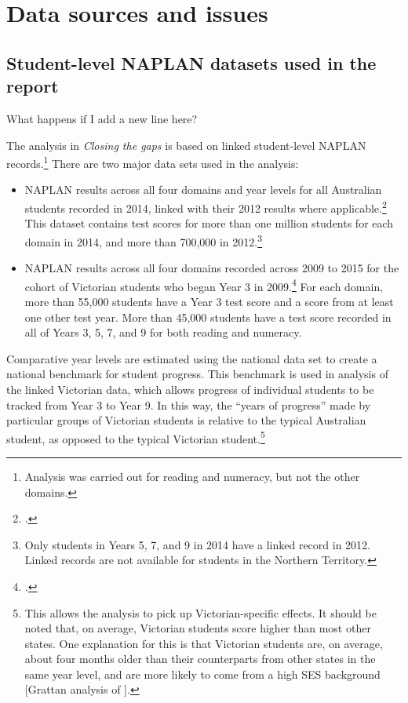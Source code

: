 \chapter{Data sources and issues} \label{chap2}

\section{Student-level NAPLAN datasets used in the report}

What happens if I add a new line here?

The analysis in \textit{Closing the gaps} is based on linked student-level NAPLAN records.\footnote{Analysis was carried out for reading and numeracy, but not the other domains.} There are two major data sets used in the analysis:
\begin{itemize}
\item NAPLAN results across all four domains and year levels for all Australian students recorded in 2014, linked with their 2012 results where applicable.\footcite{acara2014} This dataset contains test scores for more than one million students for each domain in 2014, and more than 700,000 in 2012.\footnote{Only students in Years 5, 7, and 9 in 2014 have a linked record in 2012. Linked records are not available for students in the Northern Territory.}
\item NAPLAN results across all four domains recorded across 2009 to 2015 for the cohort of Victorian students who began Year 3 in 2009.\footcite{vcaa2015} For each domain, more than 55,000 students have a Year 3 test score and a score from at least one other test year. More than 45,000 students have a test score recorded in all of Years 3, 5, 7, and 9 for both reading and numeracy. 
\end{itemize}

Comparative year levels are estimated using the national data set to create a national benchmark for student progress. This benchmark is used in analysis of the linked Victorian data, which allows progress of individual students to be tracked from Year 3 to Year 9. In this way, the ``years of progress'' made by particular groups of Victorian students is relative to the typical Australian student, as opposed to the typical Victorian student.\footnote{This allows the analysis to pick up Victorian-specific effects. It should be noted that, on average, Victorian students score higher than most other states. One explanation for this is that Victorian students are, on average, about four months older than their counterparts from other states in the same year level, and are more likely to come from a high SES background [Grattan analysis of \textcite{acara2014}].}

